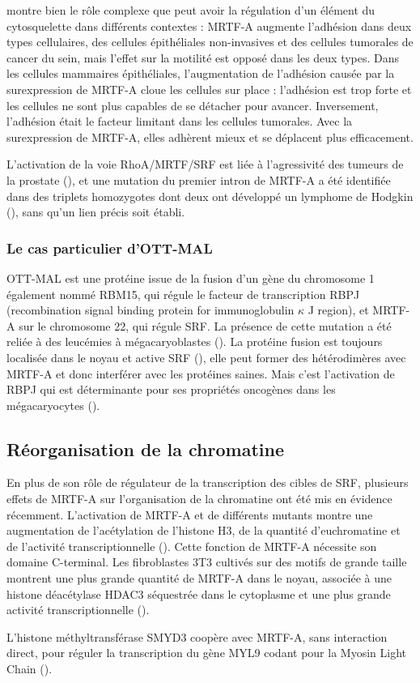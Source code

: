\cite{leitner_mal/mrtf-controls_2011} montre bien le rôle complexe que peut avoir la régulation d'un élément du cytosquelette dans différents contextes : MRTF-A augmente l'adhésion dans deux types cellulaires, des cellules épithéliales non-invasives et des cellules tumorales de cancer du sein, mais l'effet sur la motilité est opposé dans les deux types. Dans les cellules mammaires épithéliales, l'augmentation de l'adhésion causée par la surexpression de MRTF-A cloue les cellules sur place : l'adhésion est trop forte et les cellules ne sont plus capables de se détacher pour avancer. Inversement, l'adhésion était le facteur limitant dans les cellules tumorales. Avec la surexpression de MRTF-A, elles adhèrent mieux et se déplacent plus efficacement. 

L'activation de la voie RhoA/MRTF/SRF est liée à l'agressivité des tumeurs de la prostate (\cite{schmidt_rhoa_2012}), et une mutation du premier intron de MRTF-A a été identifiée dans des triplets homozygotes dont deux ont développé un lymphome de Hodgkin (\cite{bjorkholm_development_2013}), sans qu'un lien précis soit établi. 

\subsubsection{Le cas particulier d'OTT-MAL}

OTT-MAL est une protéine issue de la fusion d'un gène du chromosome 1 également nommé RBM15, qui régule le facteur de transcription RBPJ (recombination signal binding protein for immunoglobulin $\kappa$ J region), et MRTF-A sur le chromosome 22, qui régule SRF. La présence de cette mutation a été reliée à des leucémies à mégacaryoblastes (\cite{mercher_involvement_2001}). 
La protéine fusion est toujours localisée dans le noyau et active SRF (\cite{descot_ott-mal_2008}), elle peut former des hétérodimères avec MRTF-A et donc interférer avec les protéines saines. Mais c'est l'activation de RBPJ qui est déterminante pour ses propriétés oncogènes dans les mégacaryocytes (\cite{mercher_ott-mal_2009}). 

\subsection{Réorganisation de la chromatine}

En plus de son rôle de régulateur de la transcription des cibles de SRF, plusieurs effets de MRTF-A sur l'organisation de la chromatine ont été mis en évidence récemment. L'activation de MRTF-A et de différents mutants montre une augmentation de l'acétylation de l'histone H3, de la quantité d'euchromatine et de l'activité transcriptionnelle (\cite{flouriot_actin/mkl1_2014}). Cette fonction de MRTF-A nécessite son domaine C-terminal. 
Les fibroblastes 3T3 cultivés sur des motifs de grande taille montrent une plus grande quantité de MRTF-A dans le noyau, associée à une histone déacétylase HDAC3 séquestrée dans le cytoplasme et une plus grande activité transcriptionnelle (\cite{jain_cell_2013}). 

L'histone méthyltransférase SMYD3 coopère avec MRTF-A, sans interaction direct, pour réguler la transcription du gène MYL9 codant pour la Myosin Light Chain (\cite{luo_histone_2014}). 



%